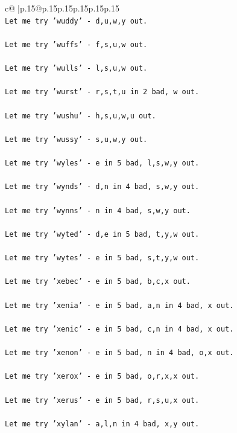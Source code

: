 \documentclass{article}
\begin{document}
{\begin{supertabular}{c@{$\;$}|p{.15\linewidth}@{}p{.15\linewidth}p{.15\linewidth}p{.15\linewidth}p{.15\linewidth}p{.15\linewidth}}
{{{\\ 
\texttt{Let me try 'wuddy' {-} d,u,w,y out. } \\
\\ 
\texttt{Let me try 'wuffs' {-} f,s,u,w out. } \\
\\ 
\texttt{Let me try 'wulls' {-} l,s,u,w out. } \\
\\ 
\texttt{Let me try 'wurst' {-} r,s,t,u in 2 bad, w out. } \\
\\ 
\texttt{Let me try 'wushu' {-} h,s,u,w,u out. } \\
\\ 
\texttt{Let me try 'wussy' {-} s,u,w,y out. } \\
\\ 
\texttt{Let me try 'wyles' {-} e in 5 bad, l,s,w,y out. } \\
\\ 
\texttt{Let me try 'wynds' {-} d,n in 4 bad, s,w,y out. } \\
\\ 
\texttt{Let me try 'wynns' {-} n in 4 bad, s,w,y out. } \\
\\ 
\texttt{Let me try 'wyted' {-} d,e in 5 bad, t,y,w out. } \\
\\ 
\texttt{Let me try 'wytes' {-} e in 5 bad, s,t,y,w out. } \\
\\ 
\texttt{Let me try 'xebec' {-} e in 5 bad, b,c,x out. } \\
\\ 
\texttt{Let me try 'xenia' {-} e in 5 bad, a,n in 4 bad, x out. } \\
\\ 
\texttt{Let me try 'xenic' {-} e in 5 bad, c,n in 4 bad, x out. } \\
\\ 
\texttt{Let me try 'xenon' {-} e in 5 bad, n in 4 bad, o,x out. } \\
\\ 
\texttt{Let me try 'xerox' {-} e in 5 bad, o,r,x,x out. } \\
\\ 
\texttt{Let me try 'xerus' {-} e in 5 bad, r,s,u,x out. } \\
\\ 
\texttt{Let me try 'xylan' {-} a,l,n in 4 bad, x,y out. } \\
\\ 
}}}
\end{supertabular}}
\end{document}
